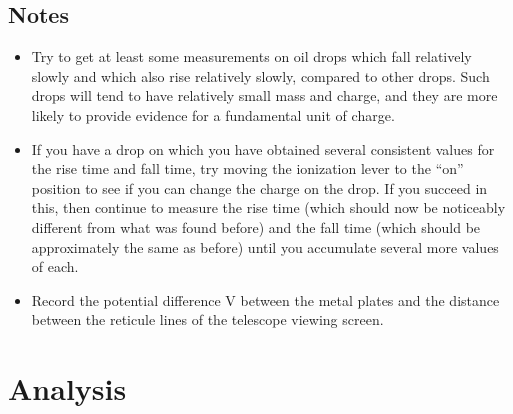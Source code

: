 \subsection{Notes}
\label{secnotes}

\begin{itemize}
\item Try to get at least some measurements on oil drops which fall
relatively slowly and which also rise relatively slowly, compared to
other drops.  Such drops will tend to have relatively small mass and
charge, and they are more likely to provide evidence for a fundamental
unit of charge.


\item If you have a drop on which you have obtained several consistent
values for the rise time and fall time, try moving the ionization lever
to the ``on'' position to see if you can
change the charge on the drop.  If you succeed in this, then continue
to measure the rise time (which should now be noticeably different from
what was found before) and the fall time (which should be approximately
the same as before) until you accumulate several more values of each.

\item Record the potential difference V between the metal plates and the
distance between the reticule lines of the telescope viewing screen.
\end{itemize}

\section{Analysis}

